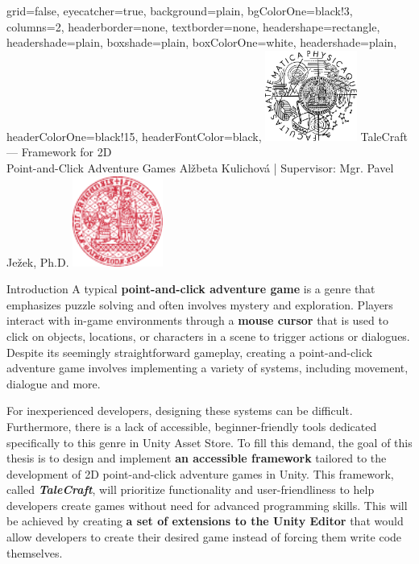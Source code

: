 \documentclass[portrait,a0paper,fontscale=0.35]{baposter}
\begin{document}
\color{black!80} %
\begin{poster}{grid=false,
	eyecatcher=true,
	background=plain,
	bgColorOne=black!3, %
	columns=2,
	headerborder=none,
	textborder=none,
	headershape=rectangle,
	headershade=plain,
	boxshade=plain,
	boxColorOne=white,
	headershade=plain,
	headerColorOne=black!15, %
	headerFontColor=black,
	}%
	{\includegraphics[height=8em]{logos/mff-black.pdf}}
	{TaleCraft — Framework for 2D\\ Point-and-Click Adventure Games}
	{\vspace{1ex} Alžbeta Kulichová | Supervisor: Mgr. Pavel Ježek, Ph.D.}
	{\includegraphics[height=8em]{logos/uk-red.pdf}}


%
%

\begin{posterbox}[column=0, span=1, name=background]{Introduction}
A typical \textbf{point-and-click adventure game} is a genre that emphasizes puzzle solving and often involves mystery and exploration. Players interact with in-game environments through a \textbf{mouse cursor} that is used to click on objects, locations, or characters in a scene to trigger actions or dialogues. Despite its seemingly straightforward gameplay, creating a point-and-click adventure game involves implementing a variety of systems, including movement, dialogue and more. 

For inexperienced developers, designing these systems can be difficult. Furthermore, there is a lack of accessible, beginner-friendly tools dedicated specifically to this genre in Unity Asset Store. To fill this demand, the goal of this thesis is to design and implement \textbf{an accessible framework} tailored to the development of 2D point-and-click adventure games in Unity. This framework, called \textit{\textbf{TaleCraft}}, will prioritize functionality and user-friendliness to help developers create games without need for advanced programming skills. This will be achieved by creating \textbf{a set of extensions to the Unity Editor} that would allow developers to create their desired game instead of forcing them write code themselves.
\end{posterbox}


\end{poster}
\end{document}
